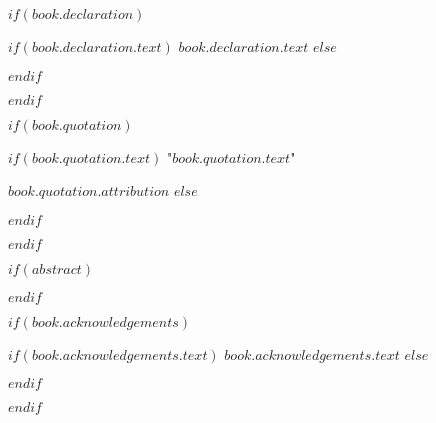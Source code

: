 $if(book.declaration)$
\begin{declaration}
\addchaptertocentry{\authorshipname} %
$if(book.declaration.text)$
$book.declaration.text$
$else$

$endif$

\end{declaration}

\cleardoublepage
$endif$

$if(book.quotation)$

\vspace*{0.2\textheight}

$if(book.quotation.text)$
\noindent"{\itshape $book.quotation.text$}"\bigbreak

\hfill $book.quotation.attribution$
$else$

$endif$

$endif$

$if(abstract)$

\begin{abstract}
\addchaptertocentry{\abstractname} %
$abstract$
\end{abstract}

$endif$

$if(book.acknowledgements)$

\begin{acknowledgements}
\addchaptertocentry{\acknowledgementname} %
$if(book.acknowledgements.text)$
$book.acknowledgements.text$
$else$

$endif$
\end{acknowledgements}

$endif$


